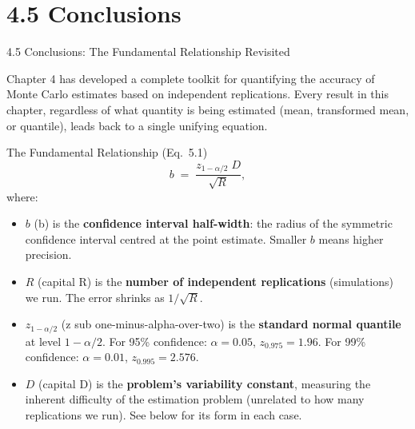 \documentclass[aspectratio=169,10pt]{beamer}
\begin{document}

\section{4.5 Conclusions}

\begin{frame}[allowframebreaks]{4.5 Conclusions: The Fundamental Relationship Revisited}

Chapter 4 has developed a complete toolkit for quantifying the accuracy of Monte
Carlo estimates based on independent replications.  Every result in this chapter,
regardless of what quantity is being estimated (mean, transformed mean, or
quantile), leads back to a single unifying equation.

\begin{block}{The Fundamental Relationship (Eq.\ 5.1)}
  \[
    b \;=\; \frac{z_{1-\alpha/2}\; D}{\sqrt{R}},
  \]
  where:
  \begin{itemize}
    \item $b$ (b) is the \textbf{confidence interval half-width}: the radius of the
      symmetric confidence interval centred at the point estimate.
      Smaller $b$ means higher precision.
    \item $R$ (capital R) is the \textbf{number of independent replications}
      (simulations) we run.  The error shrinks as $1/\sqrt{R}$.
    \item $z_{1-\alpha/2}$ (z sub one-minus-alpha-over-two) is the
      \textbf{standard normal quantile} at level $1-\alpha/2$.
      For 95\% confidence: $\alpha = 0.05$, $z_{0.975} = 1.96$.
      For 99\% confidence: $\alpha = 0.01$, $z_{0.995} = 2.576$.
    \item $D$ (capital D) is the \textbf{problem's variability constant},
      measuring the inherent difficulty of the estimation problem (unrelated
      to how many replications we run).  See below for its form in each case.
  \end{itemize}
\end{block}


\end{frame}
\end{document}
